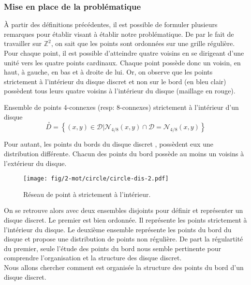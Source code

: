 \subsubsection{Mise en place de la problématique}

À partir des définitions précédentes, il est possible de formuler plusieurs remarques pour établir visant à établir notre problématique. De par le fait de travailler sur $\mathbb{Z}^{2}$, on sait que les points sont ordonnées sur une grille régulière. Pour chaque point, il est possible d'atteindre quatre voisins en se dirigeant d'une unité vers les quatre points cardinaux. Chaque point possède donc un voisin, en haut, à gauche, en bas et à droite de lui. Or, on observe que les points strictement à l'intérieur du disque discret et non sur le bord (en bleu clair) possèdent tous leurs quatre voisins à l'intérieur du disque (maillage en rouge).

\begin{Definition}{Ensemble de points 4-connexes (resp: 8-connexes) strictement à l'intérieur d'un disque}
\label{def:int-ens}
  $$ \stackrel{\ \circ}{D} =  \left\{ (x,y) \in \mathcal{D} | \mathcal{N}_{4/8}(x,y) \cap \mathcal{D} = \mathcal{N}_{4/8}(x,y) \right\}$$
\end{Definition}

Pour autant, les points du bords du disque discret , possèdent eux une distribution différente. Chacun des points du bord possède au moins un voisins à l'extérieur du disque.

\begin{figure}[H]
  \centering
  \texttt{[image: fig/2-mot/circle/circle-dis-2.pdf]}
  \caption{Réseau de point à strictement à l'intérieur.}
\end{figure}

On se retrouve alors avec deux ensembles disjoints pour définir et représenter un disque discret. Le premier est bien ordonnée. Il représente les points strictement à l'intérieur du disque. Le deuxième ensemble représente les points du bord du disque et propose une distribution de points non régulière. De part la régulartité du premier, seule l'étude des points du bord nous semble pertinente pour comprendre l'organisation et la structure des disque discret.\\

Nous allons chercher comment est organisée la structure des points du bord d'un disque discret.


